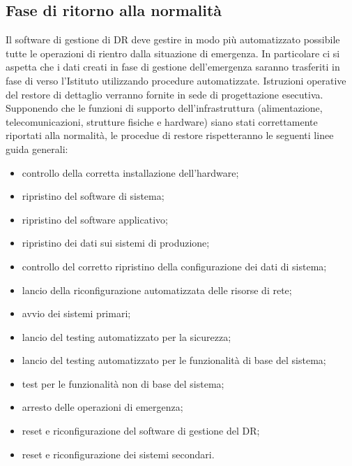 
\newpage
\subsection{Fase di ritorno alla normalità}
\label{rientro}
Il software di gestione di DR deve gestire in modo più automatizzato possibile tutte le operazioni di rientro dalla situazione di emergenza. In particolare ci si aspetta che i dati creati in fase di gestione dell'emergenza saranno trasferiti in fase di  verso l'Istituto utilizzando procedure automatizzate.
Istruzioni operative del restore di dettaglio verranno fornite in sede di progettazione esecutiva. Supponendo che le funzioni di supporto dell'infrastruttura (alimentazione,  telecomunicazioni, strutture fisiche e hardware) siano stati correttamente riportati alla normalità, le procedue di restore rispetteranno le seguenti linee guida generali:
\begin{itemize}
\item controllo della corretta installazione dell'hardware;
\item ripristino del software di sistema;
\item ripristino del software applicativo;
\item ripristino dei dati sui sistemi di produzione;
\item controllo del corretto ripristino della configurazione dei dati di sistema;
\item lancio della riconfigurazione automatizzata delle risorse di rete;
\item avvio dei sistemi primari;
\item lancio del testing automatizzato per la sicurezza;
\item lancio del testing automatizzato per le funzionalità di base del sistema;
\item test per le funzionalità non di base del sistema;
\item arresto delle operazioni di emergenza;
\item reset e riconfigurazione del software di gestione del DR;
\item reset e riconfigurazione dei sistemi secondari.
\end{itemize}

